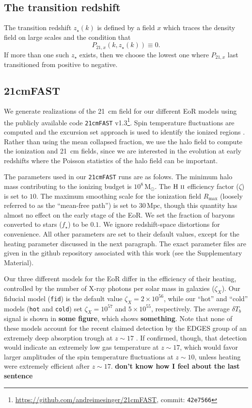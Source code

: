 \documentclass[a4paper,fleqn,usenatbib]{mnras}
\newcommand{\beq}{\begin{equation}}
\newcommand{\eeq}{\end{equation}}
\newcommand{\tfast}{\texttt{21cmFAST}}
\newcommand{\HII}{\ensuremath{\text{H~\textsc{ii}}}}
\newcommand{\Msun}{\ensuremath{\text{M}_\odot}}
\newcommand{\Mpc}{\ensuremath{\text{Mpc}}}
\newcommand{\fid}{\texttt{fid}}
\newcommand{\hot}{\texttt{hot}}
\newcommand{\cold}{\texttt{cold}}
\newcommand{\zst}{\ensuremath{z_{\star}}}
\begin{document}
\subsection{The transition redshift} \label{ssec:ztran_def}
The transition redshift $\zst(k)$ is defined by a field $x$ which traces the
density field on large scales and the condition that
\beq \label{eq:ztran_def}
P_{21,x}(k, \zst(k)) \equiv 0\text{.}
\eeq
If more than one such \zst{} exists, then we choose the lowest one where
$P_{21,x}$ last transitioned from positive to negative.

\subsection{21cmFAST} \label{ssec:tfast}
We generate realizations of the 21~cm field for our different EoR models using
the publicly available code \tfast{}
v1.3\footnote{\url{https://github.com/andreimesinger/21cmFAST}, commit:
\texttt{42e7566}}. Spin temperature fluctuations are computed and the
excursion set approach is used to identify the ionized regions
\citep{2011MNRAS.411..955M}. Rather than using the mean collapsed fraction, we
use the halo field to compute the ionization and 21~cm fields, since we are
interested in the evolution at early redshifts where the Poisson statistics of
the halo field can be important.

The parameters used in our \tfast{} runs are as folows. The minimum halo mass
contributing to the ionizing budget is $10^{8}\,\Msun$. The \HII{} efficiency
factor ($\zeta$) is set to $10$. The maximum smoothing scale for the
ionization field $R_{\text{max}}$ (loosely referred to as the ``mean-free
path'') is set to $30\,\Mpc$, though this quantity has almost no effect on the
early stage of the EoR. We set the fraction of baryons converted to stars
($f_\star$) to be $0.1$. We ignore redshift-space distortions for convenience.
All other parameters are set to their default values, except for the heating
parameter discussed in the next paragraph. The exact parameter files are given
in the github repository associated with this work (see the Supplementary
Material).

Our three different models for the EoR differ in the efficiency of their
heating, controlled by the number of X-ray photons per solar mass in galaxies
($\zeta_X$). Our fiducial model (\fid{}) is the default value
$\zeta_X=2\times10^{56}$, while our ``hot'' and ``cold'' models (\hot{} and
\cold{}) set $\zeta_X=10^{57}$ and $5\times10^{55}$, respectively. The average
$\delta T_b$ signal is shown in \textbf{some figure}, which shows
\textbf{something}. Note that none of these models account for the recent
claimed detection by the EDGES group of an extremely deep absorption trough at
$z\sim17$ \citep{2018Natur.555...67B}. If confirmed, though, that detection
would indicate an extremely low gas temperature at $z\sim17$, which would
favor larger amplitudes of the spin temperature fluctuations at $z\sim10$,
unless heating were extremely efficient after $z\sim17$. {\bf don't know how I
feel about the last sentence}
\end{document}
